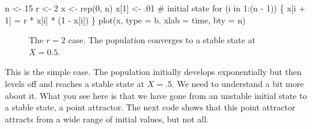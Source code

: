 \documentclass[
  a4paper,
  DIV=11,
  numbers=noendperiod,
  oneside]{scrreprt}
\newenvironment{Shaded}{}{}
\newcommand{\AttributeTok}[1]{\textcolor[rgb]{0.84,0.23,0.29}{#1}}
\newcommand{\CommentTok}[1]{\textcolor[rgb]{0.42,0.45,0.49}{#1}}
\newcommand{\ControlFlowTok}[1]{\textcolor[rgb]{0.84,0.23,0.29}{#1}}
\newcommand{\DecValTok}[1]{\textcolor[rgb]{0.00,0.36,0.77}{#1}}
\newcommand{\FunctionTok}[1]{\textcolor[rgb]{0.44,0.26,0.76}{#1}}
\newcommand{\NormalTok}[1]{\textcolor[rgb]{0.14,0.16,0.18}{#1}}
\newcommand{\OtherTok}[1]{\textcolor[rgb]{0.44,0.26,0.76}{#1}}
\newcommand{\SpecialCharTok}[1]{\textcolor[rgb]{0.00,0.36,0.77}{#1}}
\newcommand{\StringTok}[1]{\textcolor[rgb]{0.01,0.18,0.38}{#1}}
\begin{document}
\begin{Shaded}
\begin{Highlighting}[]
\NormalTok{n }\OtherTok{\textless{}{-}} \DecValTok{15}
\NormalTok{r }\OtherTok{\textless{}{-}} \DecValTok{2}
\NormalTok{x }\OtherTok{\textless{}{-}} \FunctionTok{rep}\NormalTok{(}\DecValTok{0}\NormalTok{, n)}
\NormalTok{x[}\DecValTok{1}\NormalTok{] }\OtherTok{\textless{}{-}}\NormalTok{ .}\DecValTok{01} \CommentTok{\# initial state}
\ControlFlowTok{for}\NormalTok{ (i }\ControlFlowTok{in} \DecValTok{1}\SpecialCharTok{:}\NormalTok{(n }\SpecialCharTok{{-}} \DecValTok{1}\NormalTok{)) \{}
\NormalTok{  x[i }\SpecialCharTok{+} \DecValTok{1}\NormalTok{] }\OtherTok{=}\NormalTok{ r }\SpecialCharTok{*}\NormalTok{ x[i] }\SpecialCharTok{*}\NormalTok{ (}\DecValTok{1} \SpecialCharTok{{-}}\NormalTok{ x[i])}
\NormalTok{\}}
\FunctionTok{plot}\NormalTok{(x, }\AttributeTok{type =} \StringTok{\textquotesingle{}b\textquotesingle{}}\NormalTok{, }\AttributeTok{xlab =} \StringTok{\textquotesingle{}time\textquotesingle{}}\NormalTok{, }\AttributeTok{bty =} \StringTok{\textquotesingle{}n\textquotesingle{}}\NormalTok{)}
\end{Highlighting}
\end{Shaded}

\begin{figure}


\caption{\label{fig-ch2-img2}The \(r=2\) case. The population converges
to a stable state at \(X=0.5\).}

\end{figure}%

This is the simple case. The population initially develops exponentially
but then levels off and reaches a stable state at \(X = .5\). We need to
understand a bit more about it. What you see here is that we have gone
from an unstable initial state to a stable state, a point attractor. The
next code shows that this point attractor attracts from a wide range of
initial values, but not all.
\end{document}
